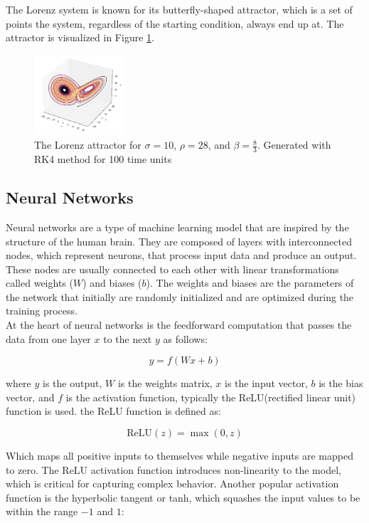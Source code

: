 \documentclass[11pt]{article}
\begin{document}
The Lorenz system is known for its butterfly-shaped attractor, which is a set of points the system, regardless of the starting condition, always end up at. The attractor is visualized in Figure \ref{fig:lorenz_attractor}.

\begin{figure}[h]
\centering
\includegraphics[width=0.3\textwidth]{lorenz_attractor.jpeg}
\caption{The Lorenz attractor for $\sigma = 10$, $\rho = 28$, and $\beta = \frac{8}{3}$. Generated with RK4 method for 100 time units}
\label{fig:lorenz_attractor}
\end{figure}

\subsection{Neural Networks}

Neural networks are a type of machine learning model that are inspired by the structure of the human brain. They are composed of layers with interconnected nodes, which represent neurons, that process input data and produce an output. These nodes are usually connected to each other with linear transformations called weights (\(W\)) and biases (\(b\)). The weights and biases are the parameters of the network that initially are randomly initialized and are optimized during the training process. \\

At the heart of neural networks is the feedforward computation that passes the data from one layer \(x\) to the next \(y\) as follows:

\[ y = f(Wx + b) \]

where \(y\) is the output, \(W\) is the weights matrix, \(x\) is the input vector, \(b\) is the bias vector, and \(f\) is the activation function, typically the ReLU(rectified linear unit) function is used. the ReLU function is defined as:

\[ \text{ReLU}(z) = \max(0, z) \]

Which maps all positive inputs to themselves while negative inputs are mapped to zero. The ReLU activation function introduces non-linearity to the model, which is critical for capturing complex behavior. Another popular activation function is the hyperbolic tangent or tanh, which squashes the input values to be within the range \(-1\) and \(1\):
\end{document}
